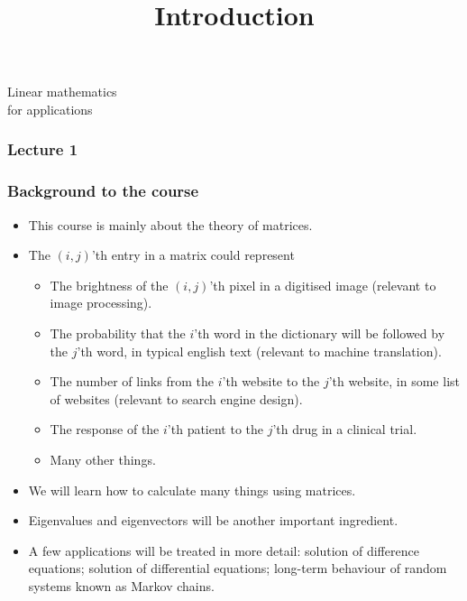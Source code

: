 \documentclass[9pt]{beamer}
\title{Introduction}
\author{}
\begin{document}



\begin{frame}[t]
\frametitle{}
 {\Huge
  \vspace{6ex}
  \begin{center}
   Linear mathematics\\for applications
  \end{center}
 }
\end{frame}

\begin{frame}\frametitle{Lecture 1}\end{frame}

\begin{frame}[t]
 \frametitle{Background to the course}
 \begin{itemize}
  \item<1-> This course is mainly about the theory of matrices.
  \item<2-> The $(i,j)$'th entry in a matrix could represent
   \begin{itemize}
   \item<3-> The brightness of the $(i,j)$'th pixel in a digitised
     image (relevant to image processing).
    \item<4-> The probability that the $i$'th word in the dictionary
     will be followed by the $j$'th word, in typical english text
     (relevant to machine translation).
    \item<5-> The number of links from the $i$'th website to the $j$'th
     website, in some list of websites (relevant to search engine
     design).
    \item<6-> The response of the $i$'th patient to the $j$'th drug in
     a clinical trial.
    \item<7-> Many other things.
   \end{itemize}
  \item<8-> We will learn how to calculate many things using
   matrices.    
  \item<12-> Eigenvalues and eigenvectors will be another important
   ingredient.
  \item<13-> A few applications will be treated in more detail:
   solution of difference equations; solution of differential
   equations; long-term behaviour of random systems known as Markov
   chains. 
 \end{itemize}
\end{frame}
\end{document}
